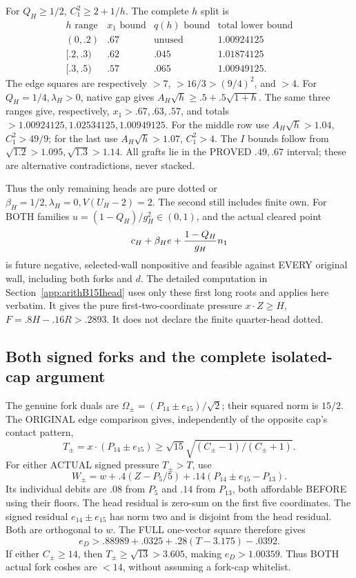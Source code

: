 \documentclass[11pt]{article}
\begin{document}
For \(Q_H\ge1/2\), \(C_1^2\ge2+1/h\).
The complete \(h\) split is
\[
\begin{array}{c|c|c|c}
 h\text{ range}&x_1\text{ bound}&q(h)\text{ bound}
                            &\text{total lower bound}\\ \hline
(0,.2)&.67&\text{unused}&1.00924125\\
{}[.2,.3)&.62&.045&1.01874125\\
{}[.3,.5)&.57&.065&1.00949125 .
\end{array}
\]
The edge squares are respectively \(>7\),
\(>16/3>(9/4)^2\), and \(>4\).
For \(Q_H=1/4,\lambda_H>0\), native gap gives
\(A_H\sqrt h\ge.5+.5\sqrt{1+h}\).
The same three ranges give, respectively,
\(x_1>.67,.63,.57\), and totals
\(>1.00924125,1.02534125,1.00949125\).
For the middle row use \(A_H\sqrt h>1.04\),
\(C_1^2>49/9\); for the last use
\(A_H\sqrt h>1.07\), \(C_1^2>4\).
The \(I\) bounds follow from
\(\sqrt{1.2}>1.095,\sqrt{1.3}>1.14\).
All grafts lie in the PROVED \(.49,.67\) interval;
these are alternative contradictions, never stacked.

Thus the only remaining heads are pure dotted or
\(\beta_H=1/2,\lambda_H=0,V(U_H-2)=2\).
The second still includes finite own.
For BOTH families \(u=(1-Q_H)/g_H^2\in(0,1)\),
and the actual cleared point
\[
                  c_H+\beta_He+{1-Q_H\over g_H}n_1
\]
is future negative, selected-wall nonpositive and
feasible against EVERY original wall, including both
forks and \(d\).
The detailed computation in
Section~\ref{app:arithB15Ihead} uses only these
first long roots and applies here verbatim.
It gives the pure first-two-coordinate pressure
\(x\cdot Z\ge H\), \(F=.8H-.16R>.2893\).
It does not declare the finite quarter-head dotted.

\subsection{Both signed forks and the complete isolated-cap argument}
\label{app:arithD15Iforkisolated}

The genuine fork duals are
\(\Omega_\pm=(P_{14}\pm e_{15})/\sqrt2\);
their squared norm is \(15/2\).
The ORIGINAL edge comparison gives, independently
of the opposite cap's contact pattern,
\[
 T_\pm=x\cdot(P_{14}\pm e_{15})
       \ge\sqrt{15}\sqrt{(C_\pm-1)/(C_\pm+1)} .
\]
For either ACTUAL signed pressure \(T_\pm>T\), use
\[
          W_\pm=w+.4(Z-P_5/5)
                     +.14(P_{14}\pm e_{15}-P_{13}).
\]
Its individual debits are \(.08\) from \(P_5\)
and \(.14\) from \(P_{13}\), both affordable BEFORE
using their floors.
The head residual is zero-sum on the first five
coordinates.
The signed residual \(e_{14}\pm e_{15}\) has norm
two and is disjoint from the head residual.
Both are orthogonal to \(w\).
The FULL one-vector square therefore gives
\[
 e_D>.88989+.0325+.28(T-3.175)-.0392 .
\tag{DF}\label{eq:arithD15Iforkbudget}
\]
If either \(C_\pm\ge14\), then
\(T_\pm\ge\sqrt{13}>3.605\), making \(e_D>1.00359\).
Thus BOTH actual fork coshes are \(<14\),
without assuming a fork-cap whitelist.
\end{document}
